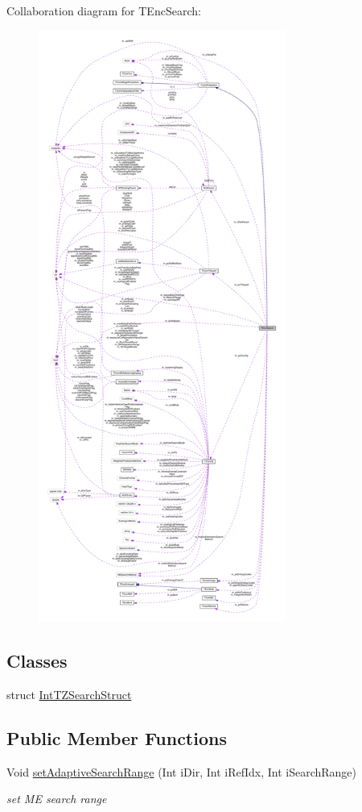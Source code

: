 Collaboration diagram for T\+Enc\+Search\+:
\nopagebreak
\begin{figure}[H]
\begin{center}
\leavevmode
\includegraphics[height=550pt]{dc/da7/class_t_enc_search__coll__graph}
\end{center}
\end{figure}
\subsection*{Classes}
\begin{DoxyCompactItemize}
\item 
struct \hyperlink{struct_t_enc_search_1_1_int_t_z_search_struct}{Int\+T\+Z\+Search\+Struct}
\end{DoxyCompactItemize}
\subsection*{Public Member Functions}
\begin{DoxyCompactItemize}
\item 
\mbox{\label{class_t_enc_search_a9a241d711b0c24254a6709859c147995}} 
Void \hyperlink{class_t_enc_search_a9a241d711b0c24254a6709859c147995}{set\+Adaptive\+Search\+Range} (Int i\+Dir, Int i\+Ref\+Idx, Int i\+Search\+Range)
\begin{DoxyCompactList}\small\item\em set ME search range \end{DoxyCompactList}\end{DoxyCompactItemize}
